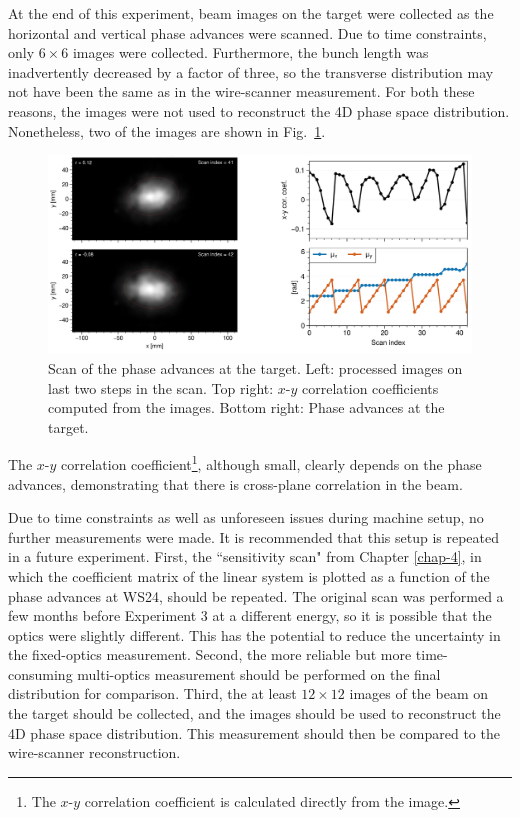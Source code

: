 At the end of this experiment, beam images on the target were collected as the horizontal and vertical phase advances were scanned. Due to time constraints, only $6 \times 6$ images were collected. Furthermore, the bunch length was inadvertently decreased by a factor of three, so the transverse distribution may not have been the same as in the wire-scanner measurement. For both these reasons, the images were not used to reconstruct the 4D phase space distribution. Nonetheless, two of the images are shown in Fig.~\ref{fig:exp3_target_scan}. 
%
\begin{figure}[!p]
    \centering
    \includegraphics[width=\textwidth]{Images/chapter5/exp3/target_scan/target_scan.png}
    \caption{Scan of the phase advances at the target. Left: processed images on last two steps in the scan. Top right: $x$-$y$ correlation coefficients computed from the images. Bottom right: Phase advances at the target.}
    \label{fig:exp3_target_scan}
\end{figure}
%
The $x$-$y$ correlation coefficient\footnote{The $x$-$y$ correlation coefficient is calculated directly from the image.}, although small, clearly depends on the phase advances, demonstrating that there is cross-plane correlation in the beam. 

Due to time constraints as well as unforeseen issues during machine setup, no further measurements were made. It is recommended that this setup is repeated in a future experiment. First, the ``sensitivity scan" from Chapter \ref{chap-4}, in which the coefficient matrix of the linear system is plotted as a function of the phase advances at WS24, should be repeated. The original scan was performed a few months before Experiment 3 at a different energy, so it is possible that the optics were slightly different. This has the potential to reduce the uncertainty in the fixed-optics measurement. Second, the more reliable but more time-consuming multi-optics measurement should be performed on the final distribution for comparison. Third, the at least $12 \times 12$ images of the beam on the target should be collected, and the images should be used to reconstruct the 4D phase space distribution. This measurement should then be compared to the wire-scanner reconstruction.


